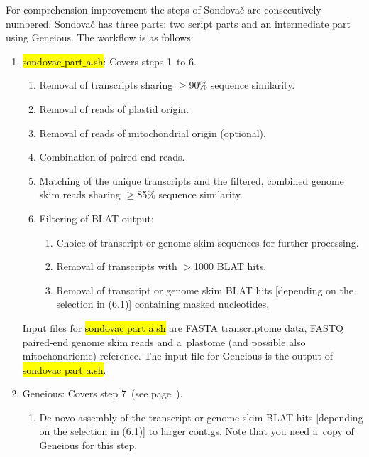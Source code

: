 \documentclass[a4paper, 11pt, twoside]{article}
\renewcommand{\texttt}[1]{\hl{\ttfamily #1}}
\begin{document}
For comprehension improvement the steps of Sondovač are consecutively numbered. Sondovač has three parts: two script parts and an intermediate part using Geneious. The workflow is as follows:

\begin{enumerate}[label=\textbf{\Alph*.}]
  \label{pipeline-overview}
  \item \texttt{sondovac$\_$part$\_$a.sh}: Covers steps 1~to 6.
    \begin{enumerate}[label=\textbf{\arabic*.}]
      \item Removal of transcripts sharing $\geq$90\% sequence similarity.
      \item Removal of reads of plastid origin.
      \item Removal of reads of mitochondrial origin (optional).
      \item Combination of paired-end reads.
      \item Matching of the unique transcripts and the filtered, combined genome skim reads sharing $\geq$85\% sequence similarity.
      \item Filtering of BLAT output:
	\begin{enumerate}[label=\textbf{6.\arabic*.}]
	\item Choice of transcript or genome skim sequences for further processing.
	\item Removal of transcripts with $>$1000 BLAT hits.
	\item Removal of transcript or genome skim BLAT hits [depending on the selection in (6.1)] containing masked nucleotides.
	\end{enumerate}
    \end{enumerate}

  Input files for \texttt{sondovac$\_$part$\_$a.sh} are FASTA transcriptome data, FASTQ paired-end genome skim reads and a~plastome (and possible also mitochondriome) reference. The input file for Geneious is the output of \texttt{sondovac$\_$part$\_$a.sh}.

  \item Geneious: Covers step 7~(see page~\pageref{geneious}).
    \begin{enumerate}[label=\textbf{\arabic*.}, resume]
    \item De novo assembly of the transcript or genome skim BLAT hits [depending on the selection in (6.1)] to larger contigs. Note that you need a~copy of Geneious for this step.
    \end{enumerate}


\end{enumerate}
\end{document}
